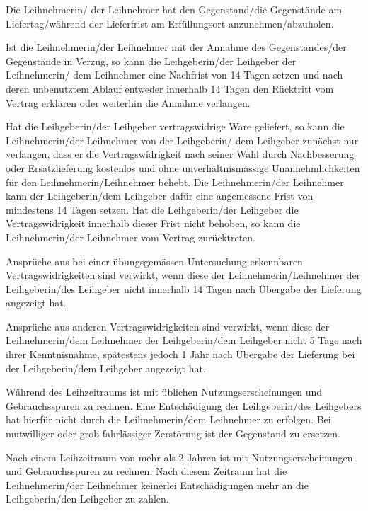\documentclass[article, 11pt,a4paper, titlepage, parskip=half, bibliography=totocnumbered]{scrreprt}
\begin{document}
\begin{contract}
		
		Die Leihnehmerin/ der Leihnehmer hat den Gegenstand/die Gegenstände am Liefertag/während der Lieferfrist am Erfüllungsort anzunehmen/abzuholen.
		
		Ist die Leihnehmerin/der Leihnehmer mit der Annahme des Gegenstandes/der Gegenstände in Verzug, so kann die Leihgeberin/der Leihgeber der Leihnehmerin/ dem Leihnehmer eine Nachfrist von 14 Tagen setzen und nach deren unbenutztem Ablauf entweder innerhalb 14 Tagen den Rücktritt vom Vertrag erklären oder weiterhin die Annahme verlangen.
		
		
		
		Hat die Leihgeberin/der Leihgeber vertragswidrige Ware geliefert, so kann die Leihnehmerin/der Leihnehmer von der Leihgeberin/ dem Leihgeber zunächst nur verlangen, dass er die Vertragswidrigkeit nach seiner Wahl durch Nachbesserung oder Ersatzlieferung kostenlos und ohne unverhältnismässige Unannehmlichkeiten für den Leihnehmerin/Leihnehmer behebt. Die Leihnehmerin/der Leihnehmer kann der Leihgeberin/dem Leihgeber dafür eine angemessene Frist von mindestens 14 Tagen setzen. Hat die Leihgeberin/der Leihgeber die Vertragswidrigkeit innerhalb dieser Frist nicht behoben, so kann die Leihnehmerin/der Leihnehmer vom Vertrag zurücktreten.
		
		
		
		Ansprüche aus bei einer übungsgemässen Untersuchung erkennbaren Vertragswidrigkeiten sind verwirkt, wenn diese der Leihnehmerin/Leihnehmer der Leihgeberin/des Leihgeber nicht innerhalb 14 Tagen nach Übergabe der Lieferung angezeigt hat.
		
		Ansprüche aus anderen Vertragswidrigkeiten sind verwirkt, wenn diese der Leihnehmerin/dem Leihnehmer der Leihgeberin/dem Leihgeber nicht 5 Tage nach ihrer Kenntnisnahme, spätestens jedoch 1 Jahr nach Übergabe der Lieferung bei der Leihgeberin/dem Leihgeber angezeigt hat.
		
		Während des Leihzeitraums ist mit üblichen Nutzungserscheinungen und Gebrauchsspuren zu rechnen. Eine Entschädigung der Leihgeberin/des Leihgebers hat hierfür nicht durch die Leihnehmerin/dem Leihnehmer zu erfolgen. Bei mutwilliger oder grob fahrlässiger Zerstörung ist der Gegenstand zu ersetzen.

		Nach einem Leihzeitraum von mehr als 2 Jahren ist mit Nutzungserscheinungen und Gebrauchsspuren zu rechnen. Nach diesem Zeitraum hat die Leihnehmerin/der Leihnehmer keinerlei Entschädigungen mehr an die Leihgeberin/den Leihgeber zu zahlen.		
		

\end{contract}
\end{document}
